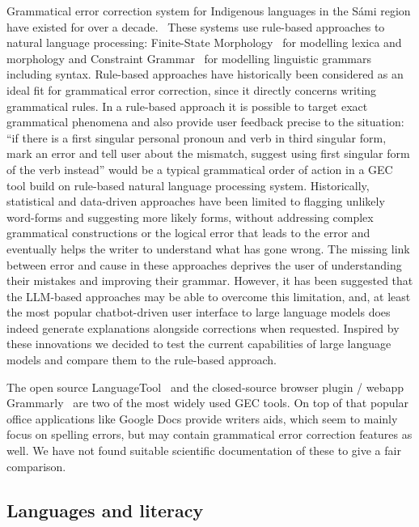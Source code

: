 \documentclass[free]{flammie}
\begin{document}
Grammatical error correction system for Indigenous languages in the Sámi region
have existed for over a decade.~\cite{Wiechetek2012constraint} These systems use
rule-based approaches to natural language processing: Finite-State
Morphology~\cite{beesley2003finite} for modelling lexica and morphology and
Constraint Grammar~\cite{karlsson1990constraint} for modelling linguistic
grammars including syntax. Rule-based approaches have historically been
considered as an ideal fit for grammatical error correction, since it directly
concerns writing grammatical rules. In a rule-based approach it is possible to
target exact grammatical phenomena and also provide user feedback precise to the
situation: ``if there is a first singular personal pronoun and verb in third
singular form, mark an error and tell user about the mismatch, suggest using
first singular form of the verb instead'' would be a typical grammatical order
of action in a GEC tool build on rule-based natural language processing system.
Historically, statistical and data-driven approaches have been limited to
flagging unlikely word-forms and suggesting more likely forms, without
addressing complex grammatical constructions or the logical error that leads to
the error and eventually helps the writer to understand what has gone wrong.
The missing link between error and cause in these approaches deprives the user
of understanding their mistakes and improving their grammar. However, it has
been suggested that the LLM-based approaches may be able to overcome this
limitation, and, at least the most popular chatbot-driven user interface to
large language models does indeed generate explanations alongside corrections
when requested. Inspired by these innovations we decided to test the current
capabilities of large language models and compare them to the rule-based
approach.

The open source LanguageTool~\cite{naber2003rule} and the closed-source browser
plugin / webapp Grammarly~\cite{alikaniotis2019unreasonable} are two of the most
widely used GEC tools. On top of that popular office applications like Google
Docs provide writers aids, which seem to mainly focus on spelling errors, but
may contain grammatical error correction features as well. We have not found
suitable scientific documentation of these to give a fair comparison.

\subsection{Languages and literacy}
\end{document}
